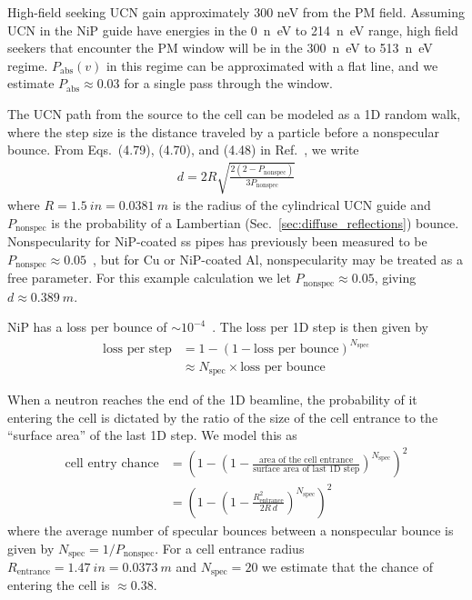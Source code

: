 High-field seeking UCN gain approximately 300 neV from the PM field. Assuming UCN in the NiP guide have energies in the \qty{0}{n\eV} to \qty{214}{n\eV} range, high field seekers that encounter the PM window will be in the \qty{300}{n\eV} to \qty{513}{n\eV} regime. $P_\text{abs}(v)$ in this regime can be approximated with a flat line, and we estimate $P_\text{abs}\approx 0.03$ for a single pass through the window.

The UCN path from the source to the cell can be modeled as a 1D random walk, where the step size is the distance traveled by a particle before a nonspecular bounce. From Eqs.~(4.79), (4.70), and (4.48) in Ref.~\cite{golubUCN}, we write
%
\begin{gather}
    d = 2 R\sqrt{\frac{2(2-P_\text{nonspec})}{3P_\text{nonspec}} }
\end{gather}
%
where $R=\qty{1.5}{in}=\qty{0.0381}{m}$ is the radius of the cylindrical UCN guide and $P_\text{nonspec}$ is the probability of a Lambertian (Sec.~\ref{sec:diffuse_reflections}) bounce. Nonspecularity for NiP-coated \acrshort{ss} pipes has previously been measured to be $P_\text{nonspec}\approx0.05$~\cite{pattie_jr_evaluation_2017}, but for Cu or NiP-coated Al, nonspecularity may be treated as a free parameter. For this example calculation we let $P_\text{nonspec}\approx0.05$, giving $d\approx \qty{0.389}{m}$.

NiP has a loss per bounce of $\sim 10^{-4}$~\cite{pattie_jr_evaluation_2017}. The loss per 1D step is then given by
%
\begin{align}
    \text{loss per step} &= 1 - \left(1 - \text{loss per bounce} \right)^{N_\text{spec}}\\
    &\approx N_\text{spec} \times \text{loss per bounce}
\end{align}

When a neutron reaches the end of the 1D beamline, the probability of it entering the cell is dictated by the ratio of the size of the cell entrance to the ``surface area'' of the last 1D step. We model this as
%
\begin{align}
    \text{cell entry chance} &= \left(1 - \left( 1 - \frac{ \text{area of the cell entrance} } {\text{surface area of last 1D step}} \right) ^ {N_\text{spec}} \right)^2 \\
    &= \left(1 - \left( 1 - \frac{ R_\text{entrance}^{2} } {2 R \, d} \right) ^ {N_\text{spec}} \right) ^2\label{eq:cell_entry_chance}
\end{align}
%
where the average number of specular bounces between a nonspecular bounce is given by $N_\text{spec} = 1/P_\text{nonspec}$. For a cell entrance radius $R_\text{entrance}=\qty{1.47}{in}=\qty{0.0373}{m}$ and $N_\text{spec}=20$ we estimate that the chance of entering the cell  is $\approx 0.38$.


